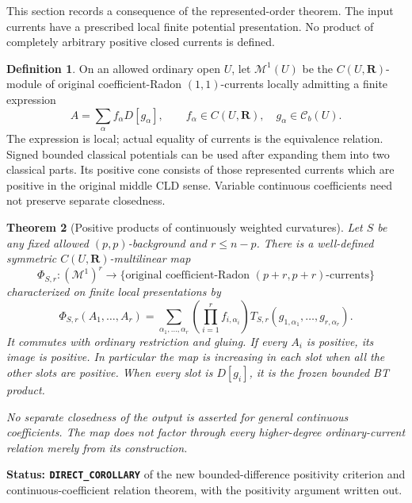 \documentclass[11pt,a4paper]{article}
\numberwithin{equation}{section}
\newtheorem{theorem}{Theorem}[section]
\theoremstyle{definition}
\newtheorem{definition}[theorem]{Definition}
\theoremstyle{remark}
\begin{document}
This section records a consequence of the represented-order theorem.
The input currents have a prescribed local finite potential
presentation. No product of completely arbitrary positive closed
currents is defined.

\begin{definition}
On an allowed ordinary open $U$, let $\mathscr M^1(U)$ be the
$C(U,\mathbf R)$-module of original coefficient-Radon $(1,1)$-currents
locally admitting a finite expression
\[
                         A=\sum_{\alpha}f_\alpha D[g_\alpha],
 \qquad f_\alpha\in C(U,\mathbf R),\quad g_\alpha\in\mathcal C_b(U).
\]
The expression is local; actual equality of currents is the equivalence
relation. Signed bounded classical potentials can be used after
expanding them into two classical parts. Its positive cone consists
of those represented currents which are positive in the original
middle CLD sense. Variable continuous coefficients need not preserve
separate closedness.
\end{definition}

\begin{theorem}[Positive products of continuously weighted curvatures]
\label{thm:r6-positive-continuous-module-products}
Let $S$ be any fixed allowed $(p,p)$-background and $r\le n-p$.
There is a well-defined symmetric $C(U,\mathbf R)$-multilinear map
\[
 \Phi_{S,r}:(\mathscr M^1)^r\longrightarrow
       \{\text{original coefficient-Radon $(p+r,p+r)$-currents}\}
\]
characterized on finite local presentations by
\begin{equation}
 \Phi_{S,r}(A_1,\ldots,A_r)
 =\sum_{\alpha_1,\ldots,\alpha_r}
    \left(\prod_{i=1}^r f_{i,\alpha_i}\right)
    T_{S,r}(g_{1,\alpha_1},\ldots,g_{r,\alpha_r}).
 \label{eq:r6-continuous-module-product}
\end{equation}
It commutes with ordinary restriction and gluing. If every $A_i$ is
positive, its image is positive. In particular the map is increasing
in each slot when all the other slots are positive. When every slot
is $D[g_i]$, it is the frozen bounded BT product.

No separate closedness of the output is asserted for general
continuous coefficients. The map does not factor through every
higher-degree ordinary-current relation merely from its construction.
\end{theorem}

\noindent\textbf{Status: \texttt{DIRECT\_COROLLARY}} of the new
bounded-difference positivity criterion and continuous-coefficient
relation theorem, with the positivity argument written out.
\end{document}
